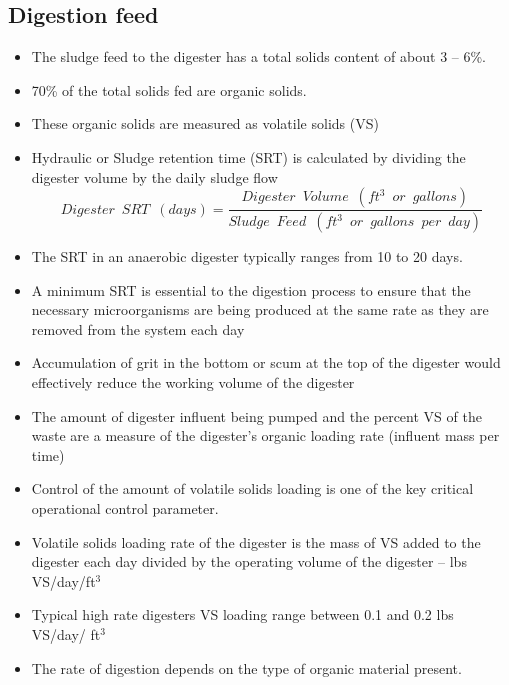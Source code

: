 \subsection{Digestion feed}
                    \begin{itemize}
                        \item The sludge feed to the digester has a total solids content of about 3 – 6\%.  
                        \item 70\% of the total solids fed are organic solids.  
                        \item These organic solids are measured as volatile solids (VS)
                        \item Hydraulic or Sludge retention time (SRT) is calculated by dividing the digester volume by the daily sludge flow
                        $$Digester \enspace SRT \enspace (days) =\dfrac{Digester \enspace Volume \enspace (ft^3 \enspace or \enspace gallons)}{Sludge \enspace Feed \enspace (ft^3 \enspace or \enspace gallons \enspace per \enspace day)}$$
                        \item The SRT in an anaerobic digester typically ranges from 10 to 20 days.
                        \item A minimum SRT is essential to the digestion process to ensure that the necessary microorganisms are being produced at the same rate as they are removed from the system each day  \\
                        \item Accumulation of grit in the bottom or scum at the top of the digester would effectively reduce the working volume of the digester
                        \item The amount of digester influent being pumped and the percent VS of the waste are a measure of the digester’s organic loading rate (influent mass per time)
                        \item Control of the amount of volatile solids loading is one of the key critical operational control parameter. 
                        \item Volatile solids loading rate of the digester is the mass of VS added to the digester each day divided by the operating volume of the digester – lbs VS/day/ft$^3$
                        \item Typical high rate digesters VS loading range between 0.1 and 0.2 lbs VS/day/ ft$^3$
                        \item The rate of digestion depends on the type of organic material present.  

\end{itemize}
